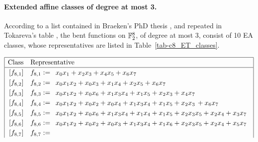 \paragraph*{Extended affine classes of degree at most 3.}
%
According to a list contained in Braeken's PhD thesis \cite[Section 5.5.2]{Bra06thesis},
and repeated in Tokareva's table \cite[Section 7.3]{Tok15bent},
the bent functions on $\mathbb{F}_2^8$, of degree at most 3, consist of 10
EA classes, whose representatives are listed in Table~\ref{tab-c8_ET_classes}.
\begin{table}[!bhpt] %
\small{}
\begin{align*}
\def\arraystretch{1.2}
\begin{array}{|cl|}
\hline
\text{Class} &
\text{Representative}
\\
\hline
\,[f_{ 8 , 1 }] & f_{ 8 , 1 } :=
\begin{array}{l}
x_{0} x_{1} + x_{2} x_{3} + x_{4} x_{5} + x_{6} x_{7}
\end{array}
\\
\,[f_{ 8 , 2 }] & f_{ 8 , 2 } :=
\begin{array}{l}
x_{0} x_{1} x_{2} + x_{0} x_{3} + x_{1} x_{4} + x_{2} x_{5} + x_{6} x_{7}
\end{array}
\\
\,[f_{ 8 , 3 }] & f_{ 8 , 3 } :=
\begin{array}{l}
x_{0} x_{1} x_{2} + x_{0} x_{6} + x_{1} x_{3} x_{4} + x_{1} x_{5} + x_{2} x_{3} + x_{4} x_{7}
\end{array}
\\
\,[f_{ 8 , 4 }] & f_{ 8 , 4 } :=
\begin{array}{l}
x_{0} x_{1} x_{2} + x_{0} x_{2} + x_{0} x_{4} + x_{1} x_{3} x_{4} + x_{1} x_{5} + x_{2} x_{3}\, +
x_{6} x_{7}
\end{array}
\\
\,[f_{ 8 , 5 }] & f_{ 8 , 5 } :=
\begin{array}{l}
x_{0} x_{1} x_{2} + x_{0} x_{6} + x_{1} x_{3} x_{4} + x_{1} x_{4} + x_{1} x_{5} + x_{2} x_{3} x_{5}
+ x_{2} x_{4} + x_{3} x_{7}
\end{array}
\\
\,[f_{ 8 , 6 }] & f_{ 8 , 6 } :=
\begin{array}{l}
x_{0} x_{1} x_{2} + x_{0} x_{2} + x_{0} x_{3} + x_{1} x_{3} x_{4} + x_{1} x_{6} + x_{2} x_{3} x_{5}
+ x_{2} x_{4} + x_{5} x_{7}
\end{array}
\\
\,[f_{ 8 , 7 }] & f_{ 8 , 7 } :=
\begin{array}{l}

\end{array}
\end{array}
\end{align*}
\end{table}
